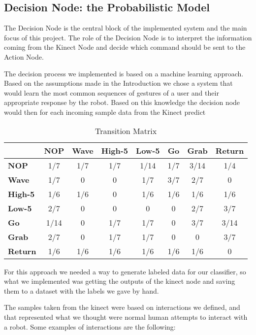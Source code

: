 \subsection{Decision Node: the Probabilistic Model}
The Decision Node is the central block of the implemented system and the main focus of this project. The role of the Decision Node is to interpret the information coming from the Kinect Node and decide which command should be sent to the Action Node.

The decision process we implemented is based on a machine learning approach. Based on the assumptions made in the Introduction we chose a system that would learn the most common sequences of gestures of a user and their appropriate response by the robot. Based on this knowledge the decision node would then for each incoming sample data from the Kinect predict


\begin{table*}[t]
\centering
\caption{Transition Matrix}
\label{transition_matrix}
\begin{tabular}{|l|ccccccc|}
\hline
 & \multicolumn{1}{c|}{\textbf{NOP}} & \multicolumn{1}{c|}{\textbf{Wave}} & \multicolumn{1}{c|}{\textbf{High-5}} & \multicolumn{1}{c|}{\textbf{Low-5}} & \multicolumn{1}{c|}{\textbf{Go}} & \multicolumn{1}{c|}{\textbf{Grab}} & \textbf{Return} \\ \hline
\textbf{NOP} & 1/7 & 1/7 & 1/7 & 1/14 & 1/7 & 3/14 & 1/4 \\ \cline{1-1}
\textbf{Wave} & 1/7 & 0 & 0 & 1/7 & 3/7 & 2/7 & 0 \\ \cline{1-1}
\textbf{High-5} & 1/6 & 1/6 & 0 & 1/6 & 1/6 & 1/6 & 1/6 \\ \cline{1-1}
\textbf{Low-5} & 2/7 & 0 & 0 & 0 & 0 & 2/7 & 3/7 \\ \cline{1-1}
\textbf{Go} & 1/14 & 0 & 1/7 & 1/7 & 0 & 3/7 & 3/14 \\ \cline{1-1}
\textbf{Grab} & 2/7 & 0 & 1/7 & 1/7 & 0 & 0 & 3/7 \\ \cline{1-1}
\textbf{Return} & 1/6 & 1/6 & 1/6 & 1/6 & 1/6 & 1/6 & 0 \\ \hline
\end{tabular}
\end{table*}

For this approach we needed a way to generate labeled data for our classifier, so what we implemented was getting the outputs of the kinect node and saving them to a dataset with the labels we gave by hand.

The samples taken from the kinect were based on interactions we defined, and that represented what we thought were normal human attempts to interact with a robot. Some examples of interactions are the following:

